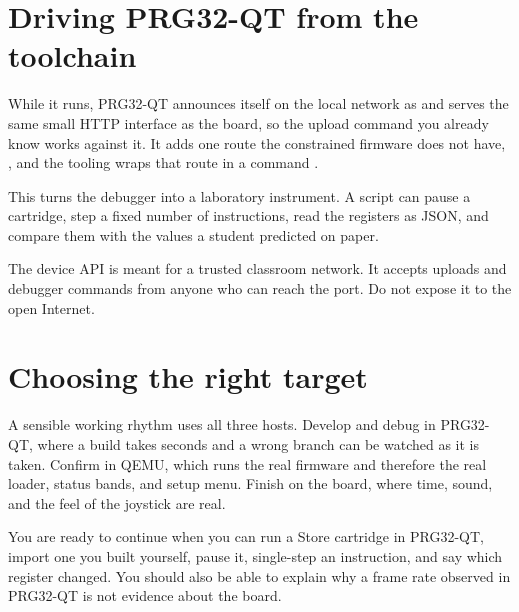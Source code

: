 \section{Driving PRG32-QT from the toolchain}

While it runs, PRG32-QT announces itself on the local network as
 and serves the same small HTTP interface as the
board, so the upload command you already know works against it. It adds one
route the constrained firmware does not have, , and the \prg
tooling wraps that route in a  command \citep{prg32repo,prg32qt}.



This turns the debugger into a laboratory instrument. A script can pause a
cartridge, step a fixed number of instructions, read the registers as JSON, and
compare them with the values a student predicted on paper.

\begin{prgwarn}
The device API is meant for a trusted classroom network. It accepts uploads and
debugger commands from anyone who can reach the port. Do not expose it to the
open Internet.
\end{prgwarn}

\section{Choosing the right target}

A sensible working rhythm uses all three hosts. Develop and debug in PRG32-QT,
where a build takes seconds and a wrong branch can be watched as it is taken.
Confirm in QEMU, which runs the real firmware and therefore the real loader,
status bands, and setup menu. Finish on the board, where time, sound, and the
feel of the joystick are real.

\begin{prgcheck}
You are ready to continue when you can run a Store cartridge in PRG32-QT, import
one you built yourself, pause it, single-step an instruction, and say which
register changed. You should also be able to explain why a frame rate observed
in PRG32-QT is not evidence about the board.
\end{prgcheck}
